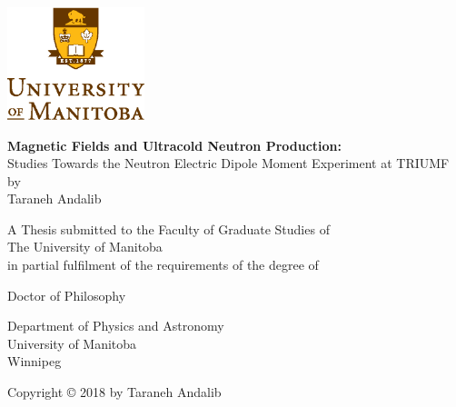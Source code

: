\documentclass[12pt,a4paper]{book}
\begin{document}

\noindent
\begin{titlepage}
  \begin{center}
         \includegraphics[width=0.3\textwidth]{university.eps}\\
        \vspace*{1cm}
        
        \textbf{Magnetic Fields and Ultracold Neutron Production: }
        \\
        Studies Towards the Neutron Electric Dipole Moment Experiment
        at TRIUMF
        \\
        by\\
        
        \vspace{1.0cm}
        Taraneh Andalib
        
        \vspace{2.0cm}
        A Thesis submitted to the Faculty of Graduate Studies of\\
        \vspace{0.5cm}
        The University of Manitoba\\
        \vspace{0.5cm}
        in partial fulfilment of the requirements of the degree of
        
        \vspace{1.5cm}
        
       
        Doctor of Philosophy\\
       \vspace{0.5cm}
        
   
        \vspace{0.5cm}
        Department of Physics and Astronomy\\
        University of Manitoba\\
        Winnipeg

        \vspace{3.0cm}
        Copyright © 2018 by Taraneh Andalib
        
    \end{center}
\end{titlepage}
\end{document}

